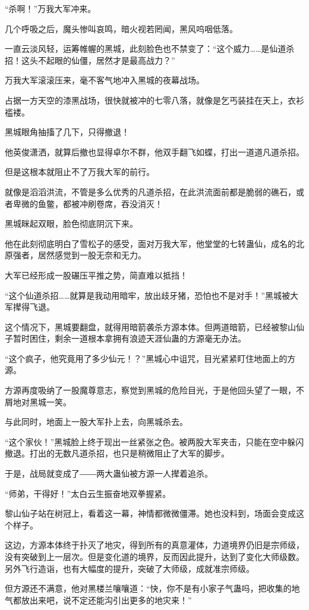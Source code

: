 \begin{this_body}
“杀啊！”万我大军冲来。

几个呼吸之后，魔头惨叫哀鸣，暗火视若罔闻，黑风呜咽低落。

一直云淡风轻，运筹帷幄的黑城，此刻脸色也不禁变了：“这个威力……是仙道杀招！这头不起眼的仙僵，居然才是最高战力？”

万我大军滚滚压来，毫不客气地冲入黑城的夜幕战场。

占据一方天空的漆黑战场，很快就被冲的七零八落，就像是乞丐装挂在天上，衣衫褴褛。

黑城眼角抽搐了几下，只得撤退！

他英俊潇洒，就算后撤也显得卓尔不群，他双手翻飞如蝶，打出一道道凡道杀招。

但是这根本就阻止不了万我大军的前行。

就像是滔滔洪流，不管是多么优秀的凡道杀招，在此洪流面前都是脆弱的礁石，或者卑微的鱼鳖，都被冲刷卷席，吞没消灭！

黑城眯起双眼，脸色彻底阴沉下来。

他在此刻彻底明白了雪松子的感受，面对万我大军，他堂堂的七转蛊仙，成名的北原强者，居然感觉到一股无奈和无力。

大军已经形成一股碾压平推之势，简直难以抵挡！

“这个仙道杀招……就算是我动用暗牢，放出歧牙猪，恐怕也不是对手！”黑城被大军撵得飞退。

这个情况下，黑城要翻盘，就得用暗箭袭杀方源本体。但两道暗箭，已经被黎山仙子暂时困住，剩余一道根本拿拥有浪迹天涯仙蛊的方源毫无办法。

“这个疯子，他究竟用了多少仙元！？”黑城心中诅咒，目光紧紧盯住地面上的方源。

方源再度吸纳了一股魔尊意志，察觉到黑城的危险目光，于是他回头望了一眼，不屑地对黑城一笑。

与此同时，地面上一股大军扑上去，向黑城杀去。

“这个家伙！”黑城脸上终于现出一丝紧张之色。被两股大军夹击，只能在空中躲闪撤退。打出的无数凡道杀招，也只是稍微阻止了大军的脚步。

于是，战局就变成了――两大蛊仙被方源一人撵着追杀。

“师弟，干得好！”太白云生振奋地双拳握紧。

黎山仙子站在树冠上，看着这一幕，神情都微微僵滞。她也没料到，场面会变成这个样子。

这边，方源本体终于扑灭了地灾，得到所有的真意灌体，力道境界仍旧是宗师级，没有突破到上一层次。但是变化道的境界，反而因此提升，达到了变化大师级数。另外飞行造诣，也有大幅度的提升，突破了大师级，成就准宗师级。

但方源还不满意，他对黑楼兰嚷嚷道：“快，你不是有小家子气蛊吗，把收集的地气都放出来吧，说不定还能沟引出更多的地灾来！”


\end{this_body}
